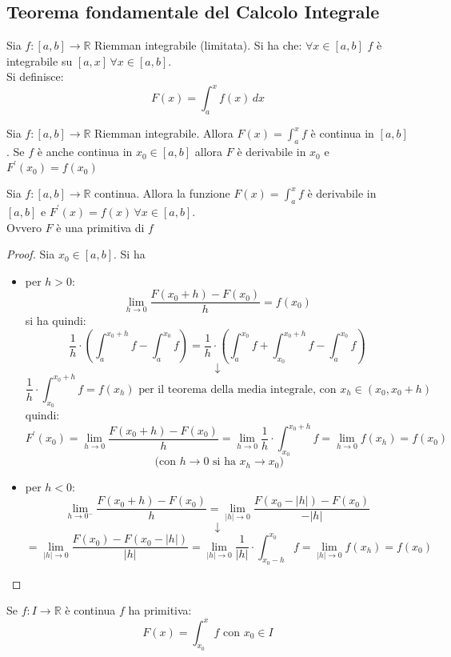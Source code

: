 \documentclass[a4paper,12pt, oneside]{book}
\begin{document}
\subsection{Teorema fondamentale del Calcolo Integrale}
\begin{teorema} Sia $f:[a,b]\rightarrow\mathbb{R}$ Riemman integrabile
  (limitata). Si ha che: $\forall x\in[a,b]$ $f$ è integrabile su $[a,x]\,\forall
  x\in[a,b]$.\\Si definisce:$$F(x)=\int_a^x f(x)\,dx$$
\end{teorema}
\begin{teorema} Sia $f:[a,b]\rightarrow\mathbb{R}$ Riemman integrabile. Allora
  $F(x)=\int_a^x f$ è continua in $[a,b]$. Se $f$ è anche continua in
  $x_0\in[a,b]$ allora $F$ è derivabile in $x_0$ e $F^{'}(x_0)=f(x_0)$
\end{teorema}
\begin{teorema} Sia
  $f:[a,b]\rightarrow\mathbb{R}$ continua. Allora la funzione $F(x)=\int_a^x f$ è
  derivabile in $[a,b]$ e $F^{'}(x)=f(x)\,\forall x\in[a,b]$.\\Ovvero $F$ è una
  primitiva di $f$
\end{teorema}
\begin{proof} Sia $x_0\in[a,b]$. Si ha
  \begin{itemize}
    \item per $h>0$:
    $$\lim_{h\rightarrow 0}\frac{F(x_0+h)-F(x_0)}{h}=f(x_0)$$
    si ha quindi:
    $$\frac{1}{h}\cdot \left( \int_a^{x_0+h} f-\int_a^{x_0} f\right)=\frac{1}{h}\cdot \left( \int_a^{x_0}f+\int_{x_0}^{x_0+h}f-\int_a^{x_0} f \right)$$
    $$\downarrow$$
    $$\frac{1}{h}\cdot\int_{x_0}^{x_0+h}f=f(x_h)\mbox{ per il teorema della media integrale, con }x_h\in(x_0,x_0+h)$$
    quindi:
    $$F^{'}(x_0)=\lim_{h\rightarrow 0}\frac{F(x_0+h)-F(x_0)}{h}=\lim_{h\rightarrow 0}\frac{1}{h}\cdot\int_{x_0}^{x_0+h}f=\lim_{h\rightarrow 0} f(x_h)=f(x_0)$$
    $$ \mbox{ (con } h\rightarrow 0 \mbox{ si ha }x_h\rightarrow x_0)$$
    \item per $h<0$:
    $$\lim_{h\rightarrow 0^{-}}\frac{F(x_0+h)-F(x_0)}{h}=\lim_{|h|\rightarrow 0}\frac{F(x_0-|h|)-F(x_0)}{-|h|}$$
    $$\downarrow$$
    $$=\lim_{|h|\rightarrow 0}\frac{F(x_0)-F(x_0-|h|)}{|h|}=\lim_{|h|\rightarrow 0}\frac{1}{|h|}\cdot\int_{x_0-h}^{x_0}f=\lim_{|h|\rightarrow 0}f(x_h)=f(x_0)$$
  \end{itemize}
\end{proof}
\begin{corollario} Se $f:I\rightarrow\mathbb{R}$ è continua $f$ ha primitiva:
  $$F(x)=\int_{x_0}^x f\mbox{ con } x_0\in I$$
\end{corollario}
\end{document}
